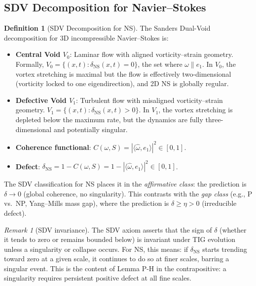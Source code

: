 \documentclass[11pt]{article}
\theoremstyle{definition}
\newtheorem{definition}[theorem]{Definition}
\theoremstyle{remark}
\newtheorem{remark}[theorem]{Remark}
\begin{document}
\subsection{SDV Decomposition for Navier--Stokes}

\begin{definition}[SDV Decomposition for NS]
\label{def:SDV-NS}
The Sanders Dual-Void decomposition for 3D incompressible Navier--Stokes is:
\begin{itemize}[nosep]
  \item \textbf{Central Void $V_0$}:  Laminar flow with aligned vorticity--strain
    geometry.  Formally, $V_0 = \{(x,t) : \delta_{\mathrm{NS}}(x,t) = 0\}$, the
    set where $\omega \| e_1$.  In $V_0$, the vortex stretching is maximal but
    the flow is effectively two-dimensional (vorticity locked to one eigendirection),
    and 2D NS is globally regular.
  \item \textbf{Defective Void $V_1$}: Turbulent flow with misaligned vorticity--strain
    geometry.  $V_1 = \{(x,t) : \delta_{\mathrm{NS}}(x,t) > 0\}$.  In $V_1$, the
    vortex stretching is depleted below the maximum rate, but the dynamics are fully
    three-dimensional and potentially singular.
  \item \textbf{Coherence functional}: $C(\omega, S) = |\langle\hat\omega, e_1\rangle|^2
    \in [0,1]$.
  \item \textbf{Defect}: $\delta_{\mathrm{NS}} = 1 - C(\omega, S)
    = 1 - |\langle\hat\omega, e_1\rangle|^2 \in [0,1]$.
\end{itemize}
\end{definition}

The SDV classification for NS places it in the \emph{affirmative class}: the
prediction is $\delta \to 0$ (global coherence, no singularity).  This contrasts with
the \emph{gap class} (e.g., P vs.\ NP, Yang--Mills mass gap), where the prediction
is $\delta \geq \eta > 0$ (irreducible defect).

\begin{remark}[SDV invariance]
The SDV axiom asserts that the sign of $\delta$ (whether it tends to zero or remains
bounded below) is invariant under TIG evolution unless a singularity or collapse
occurs.  For NS, this means: if $\delta_{\mathrm{NS}}$ starts trending toward zero
at a given scale, it continues to do so at finer scales, barring a singular event.
This is the content of Lemma P-H in the contrapositive: a singularity requires
persistent positive defect at all fine scales.
\end{remark}
\end{document}
